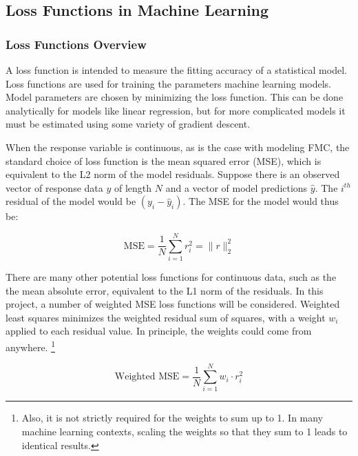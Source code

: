 \documentclass[11pt]{article}%
\begin{document}
\subsection{Loss Functions in Machine Learning}

\subsubsection{Loss Functions Overview}

A loss function is intended to measure the fitting accuracy of a statistical model. Loss functions are used for training the parameters machine learning models. Model parameters are chosen by minimizing the loss function. This can be done analytically for models like linear regression, but for more complicated models it must be estimated using some variety of gradient descent. 

When the response variable is continuous, as is the case with modeling FMC, the standard choice of loss function is the mean squared error (MSE), which is equivalent to the L2 norm of the model residuals. Suppose there is an observed vector of response data $y$ of length $N$ and a vector of model predictions $\hat y$. The $i^{th}$ residual of the model would be $(y_i - \hat y_i)$. The MSE for the model would thus be:


\begin{equation}
    \label{eq:mse}
    \text{MSE} = \frac{1}{N}\sum_{i=1}^N r_i^2 = \|r\|_2^2
\end{equation}

There are many other potential loss functions for continuous data, such as the the mean absolute error, equivalent to the L1 norm of the residuals. In this project, a number of weighted MSE loss functions will be considered. Weighted least squares minimizes the weighted residual sum of squares, with a weight $w_i$ applied to each residual value. In principle, the weights could come from anywhere. \footnote{Also, it is not strictly required for the weights to sum up to 1. In many machine learning contexts, scaling the weights so that they sum to 1 leads to identical results.}


\begin{equation}
    \label{eq:wmse}
    \text{Weighted MSE} = \frac{1}{N}\sum_{i=1}^N w_i\cdot r_i^2
\end{equation}
\end{document}

